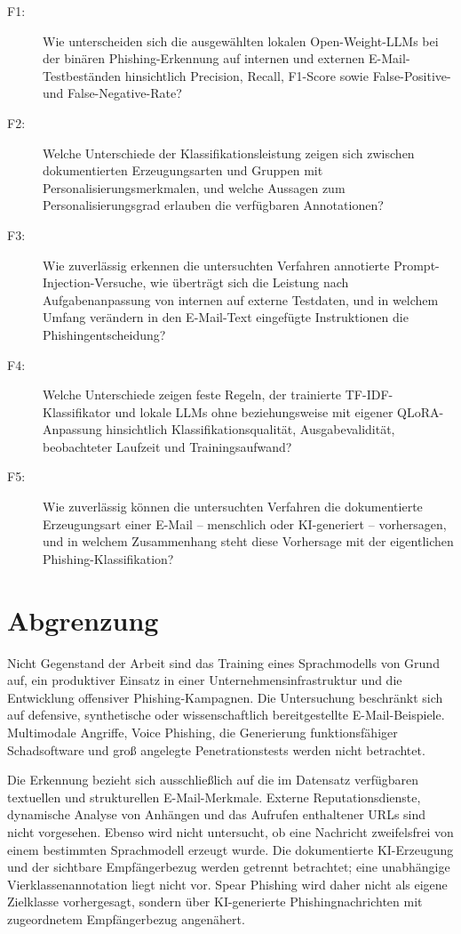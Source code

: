 \documentclass[12pt,twoside=false,a4paper,parskip]{scrbook}
\begin{document}
\begin{description}
  \item[\normalfont F1:] Wie unterscheiden sich die ausgewählten lokalen Open-Weight-LLMs bei der binären Phishing-Erkennung auf internen und externen E-Mail-Testbeständen hinsichtlich Precision, Recall, F1-Score sowie False-Positive- und False-Negative-Rate?
  \item[\normalfont F2:] Welche Unterschiede der Klassifikationsleistung zeigen sich zwischen dokumentierten Erzeugungsarten und Gruppen mit Personalisierungsmerkmalen, und welche Aussagen zum Personalisierungsgrad erlauben die verfügbaren Annotationen?
  \item[\normalfont F3:] Wie zuverlässig erkennen die untersuchten Verfahren annotierte Prompt-Injection-Versuche, wie überträgt sich die Leistung nach Aufgabenanpassung von internen auf externe Testdaten, und in welchem Umfang verändern in den E-Mail-Text eingefügte Instruktionen die Phishingentscheidung?
  \item[\normalfont F4:] Welche Unterschiede zeigen feste Regeln, der trainierte TF-IDF-Klassifikator und lokale LLMs ohne beziehungsweise mit eigener QLoRA-Anpassung hinsichtlich Klassifikationsqualität, Ausgabevalidität, beobachteter Laufzeit und Trainingsaufwand?
  \item[\normalfont F5:] Wie zuverlässig können die untersuchten Verfahren die dokumentierte Erzeugungsart einer E-Mail -- menschlich oder KI-generiert -- vorhersagen, und in welchem Zusammenhang steht diese Vorhersage mit der eigentlichen Phishing-Klassifikation?
\end{description}

\section{Abgrenzung}\label{sec:abgrenzung}

Nicht Gegenstand der Arbeit sind das Training eines Sprachmodells von Grund auf, ein produktiver Einsatz in einer Unternehmensinfrastruktur und die Entwicklung offensiver Phishing-Kampagnen. Die Untersuchung beschränkt sich auf defensive, synthetische oder wissenschaftlich bereitgestellte E-Mail-Beispiele. Multimodale Angriffe, Voice Phishing, die Generierung funktionsfähiger Schadsoftware und groß angelegte Penetrationstests werden nicht betrachtet.

Die Erkennung bezieht sich ausschließlich auf die im Datensatz verfügbaren textuellen und strukturellen E-Mail-Merkmale. Externe Reputationsdienste, dynamische Analyse von Anhängen und das Aufrufen enthaltener URLs sind nicht vorgesehen. Ebenso wird nicht untersucht, ob eine Nachricht zweifelsfrei von einem bestimmten Sprachmodell erzeugt wurde. Die dokumentierte KI-Erzeugung und der sichtbare Empfängerbezug werden getrennt betrachtet; eine unabhängige Vierklassenannotation liegt nicht vor. Spear Phishing wird daher nicht als eigene Zielklasse vorhergesagt, sondern über KI-generierte Phishingnachrichten mit zugeordnetem Empfängerbezug angenähert.
\end{document}

